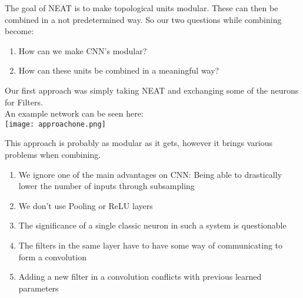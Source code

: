 The goal of NEAT is to make topological units modular.  
These can then be combined in a not predetermined way.  
So our two questions while combining become:  
\begin{enumerate}
	\item{How can we make CNN's modular?}  
	\item{How can these units be combined in a meaningful way?}  
\end{enumerate}

Our first approach was simply taking NEAT and exchanging some of the neurons for Filters.\\
An example network can be seen here:\\

\texttt{[image: approachone.png]}  

This approach is probably as modular as it gets, however it brings various problems when combining.  
\begin{enumerate}
	\item{We ignore one of the main advantages on CNN: Being able to drastically lower the number of inputs through subsampling}
	\item{We don't use Pooling or ReLU layers}
	\item{The significance of a single classic neuron in such a system is questionable}
	\item{The filters in the same layer have to have some way of communicating to form a convolution}
	\item{Adding a new filter in a convolution conflicts with previous learned parameters}
\end{enumerate}

